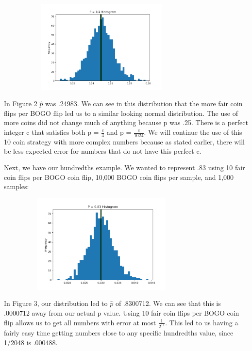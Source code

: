 \documentclass[11pt]{article}
\begin{document}
\begin{figure}[h]
    \caption
    \centering
    \includegraphics[width=8.5cm, height=4.7cm]{fourth1000.png}
    \centering
\end{figure}

In Figure 2 $\hat{p}$ was .24983. We can see in this distribution that the more fair coin flips per BOGO 
flip led us to a similar looking normal distribution. The use of more coins did not change much of anything
because p was .25. There is a perfect integer c that satisfies both p = $\frac{c}{4}$ and p = $\frac{c}{1024}$.
We will continue the use of this 10 coin strategy with more complex numbers because as stated earlier, there
will be less expected error for numbers that do not have this perfect c.

Next, we have our hundredths example. We wanted to represent .83 using 10 fair coin flips per BOGO coin flip, 
10,000 BOGO coin flips per sample, and 1,000 samples:


\begin{figure}[h]
    \caption
    \centering
    \includegraphics[width=8.5cm, height=5cm]{83-10000.png}
    \centering
\end{figure}

In Figure 3, our distribution led to $\hat{p}$ of .8300712. We can see that this is .0000712 away from our
actual p value. Using 10 fair coin flips per BOGO coin flip allows us to get all numbers with error at most
$\frac{1}{{2}^{11}}$. This led to us having a fairly easy time getting numbers close to any specific 
hundredths value, since 1/2048 is .000488.
\end{document}
